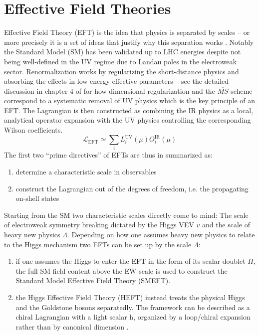 \section{Effective Field Theories}
Effective Field Theory (EFT) is the idea that physics is separated by scales -- or more precisely it is a set of ideas that justify why this separation works \cite{brivio2019standard}. Notably the Standard Model (SM) has been validated up to LHC energies despite not being well-defined in the UV regime due to Landau poles in the electroweak sector. Renormalization works by regularizing the short-distance physics and absorbing the effects in low energy effective parameters -- see the detailed discussion in chapter 4 of \cite{brivio2019standard} for how dimensional regularization and the $\overline{MS}$ scheme correspond to a systematic removal of UV physics which is the key principle of an EFT. The Lagrangian is then constructed as combining the IR physics as a local, analytical operator expansion with the UV physics controlling the corresponding Wilson coefficients.
\begin{equation}
    \mathcal{L}_\text{EFT}\simeq\sum_iL_i^\text{UV}(\mu)O_i^\text{IR}(\mu)
\end{equation}
The first two \enquote{prime directives} of EFTs are thus in \cite{brivio2019standard} summarized as:
\begin{enumerate}
    \item determine a characteristic scale in observables
    \item construct the Lagrangian out of the degrees of freedom, i.e. the propagating on-shell states
\end{enumerate}
Starting from the SM two characteristic scales directly come to mind: The scale of electroweak symmetry breaking dictated by the Higgs VEV $v$ and the scale of heavy new physics $\Lambda$. Depending on how one assumes heavy new physics to relate to the Higgs mechanism two  EFTs can be set up by the scale $\Lambda$:
\begin{enumerate}
    \item if one assumes the Higgs to enter the EFT in the form of its scalar doublet $H$, the full SM field content above the EW scale is used to construct the Standard Model Effective Field Theory (SMEFT).
    \item the Higgs Effective Field Theory (HEFT) instead treats the physical Higgs and the Goldstone bosons separatedly. The framework can be described as a chiral Lagrangian with a light scalar h, organized by a loop/chiral expansion rather than by canonical dimension \cite{buchalla2014complete}.
\end{enumerate}
